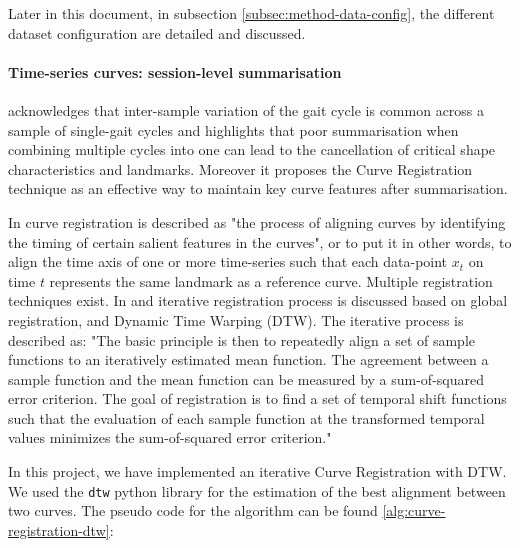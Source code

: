 Later in this document, in subsection \ref{subsec:method-data-config}, the different dataset configuration are detailed and discussed.

\paragraph{Time-series curves: session-level summarisation}
\citet{Chau2005} acknowledges that inter-sample variation of the gait cycle is common across a sample of single-gait cycles and highlights that poor summarisation when combining multiple cycles into one can lead to the cancellation of critical shape characteristics and landmarks. Moreover it proposes the Curve Registration technique \citep{Ramsay1998} as an effective way to maintain key curve features after summarisation.

In \citet{Ramsay1998} curve registration is described as "the process of aligning curves by identifying the timing of certain salient features in the curves", or to put it in other words, to align the time axis of one or more time-series such that each data-point $x_t$ on time $t$ represents the same landmark as a reference curve. Multiple registration techniques exist. In \citet{Chau2005} and iterative registration process is discussed based on global registration, and Dynamic Time Warping (DTW). The iterative process is described as: "The basic principle is then to repeatedly align a set of sample functions to an iteratively estimated mean function. The agreement between a sample function and the mean function can be measured by a sum-of-squared error criterion. The goal of registration is to find a set of temporal shift functions such that the evaluation of each sample function at the transformed temporal values minimizes the sum-of-squared error criterion."

In this project, we have implemented an iterative Curve Registration with DTW. We used the \texttt{dtw} python library \citet{Giorgino2009} for the estimation of the best alignment between two curves. The pseudo code for the algorithm can be found \ref{alg:curve-registration-dtw}:

